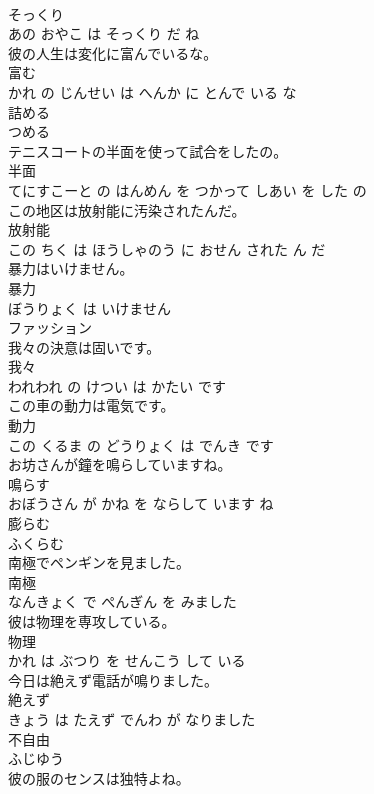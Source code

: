 \documentclass[8pt]{extreport}
\begin{document}
\begin{CJK}{UTF8}{min}
\\	そっくり 
\\	あの おやこ は そっくり だ ね			
\\	彼の人生は変化に富んでいるな。	
\\	富む 
\\	かれ の じんせい は へんか に とんで いる な			
\\	詰める	
\\	つめる		
\\	テニスコートの半面を使って試合をしたの。	
\\	半面 
\\	てにすこーと の はんめん を つかって しあい を した の			
\\	この地区は放射能に汚染されたんだ。	
\\	放射能 
\\	この ちく は ほうしゃのう に おせん された ん だ			
\\	暴力はいけません。	
\\	暴力 
\\	ぼうりょく は いけません			
\\	ファッション	
\\	我々の決意は固いです。	
\\	我々 
\\	われわれ の けつい は かたい です			
\\	この車の動力は電気です。	
\\	動力 
\\	この くるま の どうりょく は でんき です			
\\	お坊さんが鐘を鳴らしていますね。	
\\	鳴らす 
\\	おぼうさん が かね を ならして います ね			
\\	膨らむ	
\\	ふくらむ		
\\	南極でペンギンを見ました。	
\\	南極 
\\	なんきょく で ぺんぎん を みました			
\\	彼は物理を専攻している。	
\\	物理 
\\	かれ は ぶつり を せんこう して いる			
\\	今日は絶えず電話が鳴りました。	
\\	絶えず 
\\	きょう は たえず でんわ が なりました			
\\	不自由	
\\	ふじゆう		
\\	彼の服のセンスは独特よね。	

\end{CJK}
\end{document}
